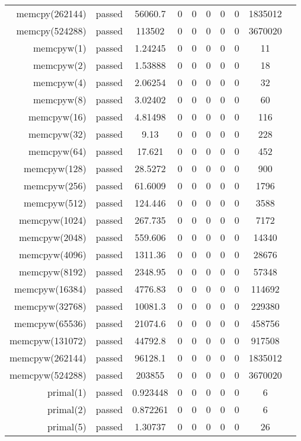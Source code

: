 \begin{longtable}{r|ccccccccc}
    memcpy(262144) & passed & 56060.7 & 0 & 0 & 0 & 0 & 0 & 1835012 \\
    memcpy(524288) & passed & 113502 & 0 & 0 & 0 & 0 & 0 & 3670020 \\
    memcpyw(1) & passed & 1.24245 & 0 & 0 & 0 & 0 & 0 & 11 \\
    memcpyw(2) & passed & 1.53888 & 0 & 0 & 0 & 0 & 0 & 18 \\
    memcpyw(4) & passed & 2.06254 & 0 & 0 & 0 & 0 & 0 & 32 \\
    memcpyw(8) & passed & 3.02402 & 0 & 0 & 0 & 0 & 0 & 60 \\
    memcpyw(16) & passed & 4.81498 & 0 & 0 & 0 & 0 & 0 & 116 \\
    memcpyw(32) & passed & 9.13 & 0 & 0 & 0 & 0 & 0 & 228 \\
    memcpyw(64) & passed & 17.621 & 0 & 0 & 0 & 0 & 0 & 452 \\
    memcpyw(128) & passed & 28.5272 & 0 & 0 & 0 & 0 & 0 & 900 \\
    memcpyw(256) & passed & 61.6009 & 0 & 0 & 0 & 0 & 0 & 1796 \\
    memcpyw(512) & passed & 124.446 & 0 & 0 & 0 & 0 & 0 & 3588 \\
    memcpyw(1024) & passed & 267.735 & 0 & 0 & 0 & 0 & 0 & 7172 \\
    memcpyw(2048) & passed & 559.606 & 0 & 0 & 0 & 0 & 0 & 14340 \\
    memcpyw(4096) & passed & 1311.36 & 0 & 0 & 0 & 0 & 0 & 28676 \\
    memcpyw(8192) & passed & 2348.95 & 0 & 0 & 0 & 0 & 0 & 57348 \\
    memcpyw(16384) & passed & 4776.83 & 0 & 0 & 0 & 0 & 0 & 114692 \\
    memcpyw(32768) & passed & 10081.3 & 0 & 0 & 0 & 0 & 0 & 229380 \\
    memcpyw(65536) & passed & 21074.6 & 0 & 0 & 0 & 0 & 0 & 458756 \\
    memcpyw(131072) & passed & 44792.8 & 0 & 0 & 0 & 0 & 0 & 917508 \\
    memcpyw(262144) & passed & 96128.1 & 0 & 0 & 0 & 0 & 0 & 1835012 \\
    memcpyw(524288) & passed & 203855 & 0 & 0 & 0 & 0 & 0 & 3670020 \\
    primal(1) & passed & 0.923448 & 0 & 0 & 0 & 0 & 0 & 6 \\
    primal(2) & passed & 0.872261 & 0 & 0 & 0 & 0 & 0 & 6 \\
    primal(5) & passed & 1.30737 & 0 & 0 & 0 & 0 & 0 & 26 \\

\end{longtable}
